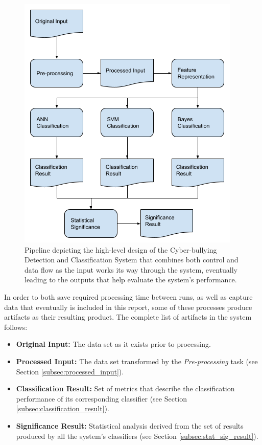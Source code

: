 \documentclass[conference]{sig-alternate-05-2015}
\begin{document}
\begin{figure}[h]
  \centering
  \includegraphics[width=\linewidth]{design.png}
  \caption{Pipeline depicting the high-level design of the Cyber-bullying
  Detection and Classification System that combines both control and data flow
  as the input works its way through the system, eventually leading to the
  outputs that help evaluate the system's performance.}
  \label{fig:design}
\end{figure}

In order to both save required processing time between runs, as well as capture
data that eventually is included in this report, some of these processes produce
artifacts as their resulting product. The complete list of artifacts in the
system follows:

\begin{itemize}
  \item \textbf{Original Input:} The data set as it exists prior to processing.
  \item \textbf{Processed Input:} The data set transformed by the
  \textit{Pre-processing} task (see Section \ref{subsec:processed_input}).
  \item \textbf{Classification Result:} Set of metrics that describe the
  classification performance of its corresponding classifier (see Section
  \ref{subsec:classification_result}).
  \item \textbf{Significance Result:} Statistical analysis derived from the set
  of results produced by all the system's classifiers (see Section
  \ref{subsec:stat_sig_result}).
\end{itemize}
\end{document}
